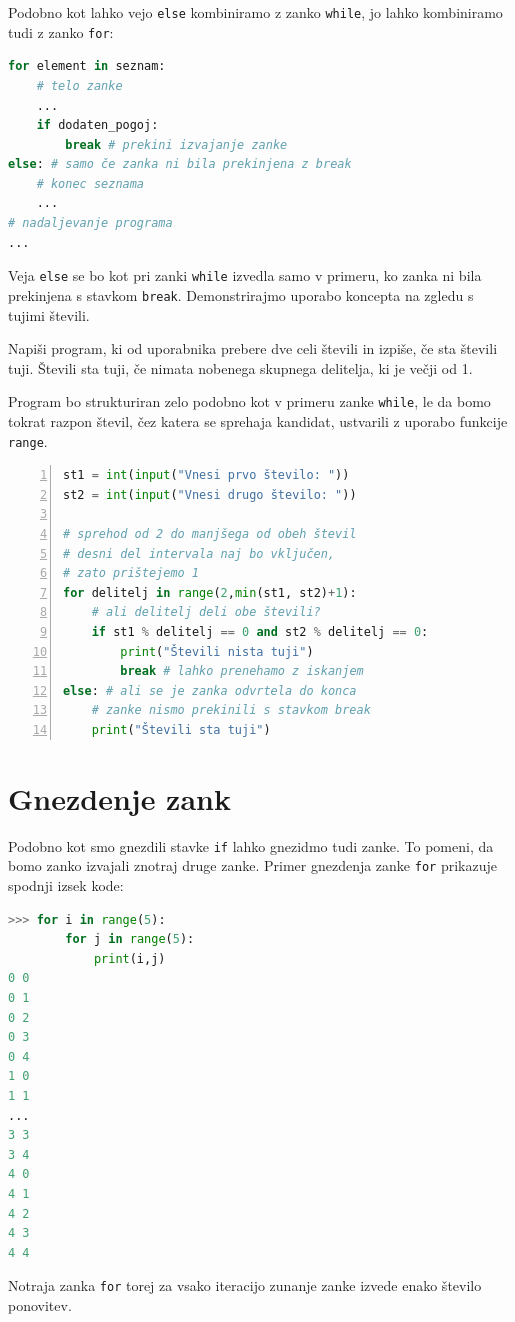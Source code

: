 Podobno kot lahko vejo \texttt{else} kombiniramo z zanko \texttt{while}, jo lahko kombiniramo tudi z zanko \texttt{for}:
\begin{lstlisting}[language=Python]
for element in seznam:
    # telo zanke
    ...
    if dodaten_pogoj:
        break # prekini izvajanje zanke
else: # samo če zanka ni bila prekinjena z break
    # konec seznama
    ...
# nadaljevanje programa
...
\end{lstlisting}

Veja \texttt{else} se bo kot pri zanki \texttt{while} izvedla samo v primeru, ko zanka ni bila prekinjena s stavkom \texttt{break}. Demonstrirajmo uporabo koncepta na zgledu s tujimi števili.

\begin{zgled}
Napiši program, ki od uporabnika prebere dve celi števili in izpiše, če sta števili tuji. Števili sta tuji, če nimata nobenega skupnega delitelja, ki je večji od 1.
\end{zgled}
\begin{resitev}
Program bo strukturiran zelo podobno kot v primeru zanke \texttt{while}, le da bomo tokrat razpon števil, čez katera se sprehaja kandidat, ustvarili z uporabo funkcije \texttt{range}. 

\begin{lstlisting}[language=Python,numbers=left]
st1 = int(input("Vnesi prvo število: "))
st2 = int(input("Vnesi drugo število: "))

# sprehod od 2 do manjšega od obeh števil
# desni del intervala naj bo vključen,
# zato prištejemo 1
for delitelj in range(2,min(st1, st2)+1):
    # ali delitelj deli obe števili?
    if st1 % delitelj == 0 and st2 % delitelj == 0:
        print("Števili nista tuji")
        break # lahko prenehamo z iskanjem
else: # ali se je zanka odvrtela do konca
    # zanke nismo prekinili s stavkom break
    print("Števili sta tuji")
\end{lstlisting}
\end{resitev}


\section{Gnezdenje zank}

Podobno kot smo gnezdili stavke \texttt{if} lahko gnezidmo tudi zanke. To pomeni, da bomo zanko izvajali znotraj druge zanke. Primer gnezdenja zanke \texttt{for} prikazuje spodnji izsek kode:
\begin{lstlisting}[language=Python]
>>> for i in range(5):
        for j in range(5):
            print(i,j)
0 0
0 1
0 2
0 3
0 4
1 0
1 1
...
3 3
3 4
4 0
4 1
4 2
4 3
4 4
\end{lstlisting}
Notraja zanka \texttt{for} torej za vsako iteracijo zunanje zanke izvede enako število ponovitev.

